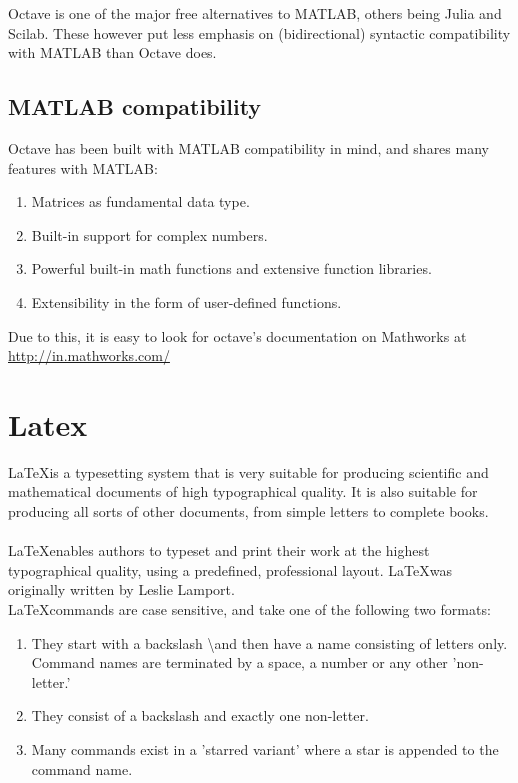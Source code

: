 \documentclass{article}
\begin{document}
Octave is one of the major free alternatives to MATLAB, others being Julia and Scilab. These however put less emphasis on (bidirectional) syntactic compatibility with MATLAB than Octave does.
        \subsection{MATLAB compatibility}
Octave has been built with MATLAB compatibility in mind, and shares many features with MATLAB:
            \begin{enumerate}
                    \item
                        Matrices as fundamental data type.
                    \item
                        Built-in support for complex numbers.
                    \item
                        Powerful built-in math functions and extensive function libraries.
                    \item
                        Extensibility in the form of user-defined functions.
            \end{enumerate}
            Due to this, it is easy to look for octave's documentation on Mathworks at \url{http://in.mathworks.com/}
	\section{Latex}
	\LaTeX is a typesetting system that is very suitable for producing scientific and mathematical documents of high typographical quality. It is also suitable for producing all sorts of other documents, from simple letters to complete books.\\
	\\
	\LaTeX enables authors to typeset and print their work at the highest typographical quality, using a predefined, professional layout. \LaTeX was originally written by Leslie Lamport.\\
	
	\LaTeX commands are case sensitive, and take one of the following two formats:
	\begin{enumerate}
		\item They start with a backslash \textbackslash and then have a name consisting of
		letters only. Command names are terminated by a space, a number or
		any other 'non-letter.'
		\item They consist of a backslash and exactly one non-letter.
		\item Many commands exist in a 'starred variant' where a star is appended
		to the command name.
	\end{enumerate}
\end{document}
